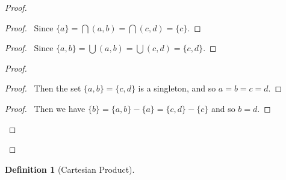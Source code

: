 \documentclass{book}
\let\qed\relax
\theoremstyle{definition}
\newtheorem{df}[prop]{Definition}
\begin{document}
\begin{proof}
    \pf
    \begin{proof}
        \pf\ Since $\{a\} = \bigcap (a,b) = \bigcap (c,d) = \{c\}$.
    \end{proof}
    \begin{proof}
        \pf\ Since $\{a,b\} = \bigcup (a,b) = \bigcup (c,d) = \{c,d\}$.
    \end{proof}
    \begin{proof}
        \begin{proof}
            \pf\ Then the set $\{a,b\} = \{c,d\}$ is a singleton, and so $a = b = c = d$.
        \end{proof}
        \begin{proof}
            \pf\ Then we have $\{b\} = \{a,b\} - \{a\}= \{c,d\} - \{c\}$ and so $b = d$.
        \end{proof}
    \end{proof}
    \qed
\end{proof}

\begin{df}[Cartesian Product]
\end{df}
\end{document}
